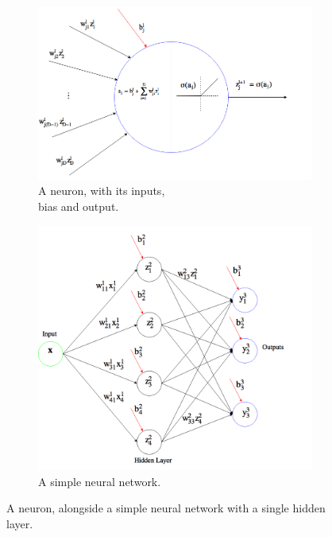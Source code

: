 \begin{figure}[H]
	\centering
	\begin{subfigure}[b]{.5\textwidth}
		\centering
		\includegraphics[width=\linewidth]{fig/neural.png}
		\caption{A neuron, with its inputs,\\ bias and output.}
		\label{fig:neuron}
	\end{subfigure}%
	\begin{subfigure}[b]{.5\textwidth}
		\centering
		\includegraphics[width=\linewidth]{fig/layers.png}
		\caption{A simple neural network.}
		\label{fig:layers}
	\end{subfigure}
	\caption{A neuron, alongside a simple neural network with a single hidden layer.}
	\label{fig:neural_net}
\end{figure}
